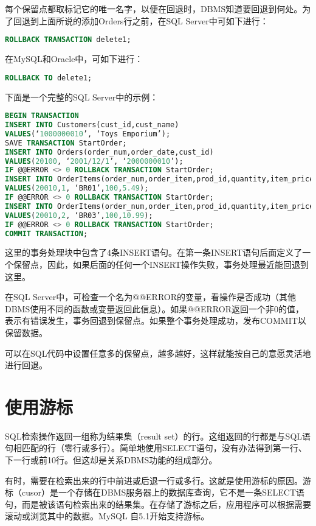 每个保留点都取标记它的唯一名字，以便在回退时，DBMS知道要回退到何处。为了回退到上面所说的添加Orders行之前，在SQL Server中可如下进行：

\begin{lstlisting}[language=SQL]
ROLLBACK TRANSACTION delete1;
\end{lstlisting}

在MySQL和Oracle中，可如下进行：

\begin{lstlisting}[language=SQL]
ROLLBACK TO delete1;
\end{lstlisting}

下面是一个完整的SQL Server中的示例：

\begin{lstlisting}[language=SQL]
BEGIN TRANSACTION
INSERT INTO Customers(cust_id,cust_name)
VALUES(‘1000000010’, ‘Toys Emporium’);
SAVE TRANSACTION StartOrder;
INSERT INTO Orders(order_num,order_date,cust_id)
VALUES(20100, ‘2001/12/1’, ‘2000000010’);
IF @@ERROR <> 0 ROLLBACK TRANSACTION StartOrder;
INSERT INTO OrderItems(order_num,order_item,prod_id,quantity,item_price)
VALUES(20010,1, ‘BR01’,100,5.49);
IF @@ERROR <> 0 ROLLBACK TRANSACTION StartOrder;
INSERT INTO OrderItems(order_num,order_item,prod_id,quantity,item_price)
VALUES(20010,2, ‘BR03’,100,10.99);
IF @@ERROR <> 0 ROLLBACK TRANSACTION StartOrder;
COMMIT TRANSACTION;
\end{lstlisting}

这里的事务处理块中包含了4条INSERT语句。在第一条INSERT语句后面定义了一个保留点，因此，如果后面的任何一个INSERT操作失败，事务处理最近能回退到这里。


在SQL Server中，可检查一个名为@@ERROR的变量，看操作是否成功（其他DBMS使用不同的函数或变量返回此信息）。如果@@ERROR返回一个非0的值，表示有错误发生，事务回退到保留点。如果整个事务处理成功，发布COMMIT以保留数据。


可以在SQL代码中设置任意多的保留点，越多越好，这样就能按自己的意愿灵活地进行回退。

\section{使用游标}


SQL检索操作返回一组称为结果集（result set）的行。这组返回的行都是与SQL语句相匹配的行（零行或多行）。简单地使用SELECT语句，没有办法得到第一行、下一行或前10行。但这却是关系DBMS功能的组成部分。

有时，需要在检索出来的行中前进或后退一行或多行。这就是使用游标的原因。游标（cusor）是一个存储在DBMS服务器上的数据库查询，它不是一条SELECT语句，而是被该语句检索出来的结果集。在存储了游标之后，应用程序可以根据需要滚动或浏览其中的数据。MySQL 自5.1开始支持游标。

